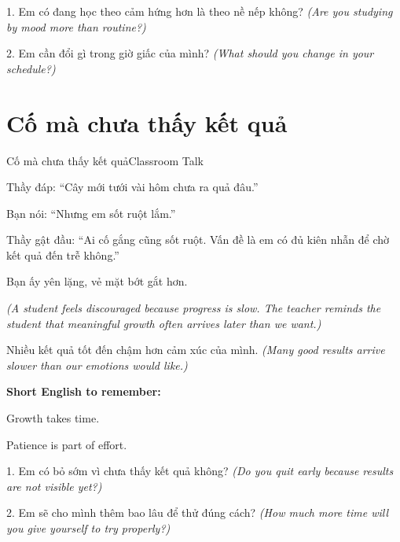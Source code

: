 \begin{tuhocnhanh}
1. Em có đang học theo cảm hứng hơn là theo nề nếp không? \textit{(Are you studying by mood more than routine?)}

2. Em cần đổi gì trong giờ giấc của mình? \textit{(What should you change in your schedule?)}
\end{tuhocnhanh}
\ngancach

\section{Cố mà chưa thấy kết quả}
\begin{truyen}{Cố mà chưa thấy kết quả}{Classroom Talk}

Thầy đáp: ``Cây mới tưới vài hôm chưa ra quả đâu.''

Bạn nói: ``Nhưng em sốt ruột lắm.''

Thầy gật đầu: ``Ai cố gắng cũng sốt ruột. Vấn đề là em có đủ kiên nhẫn để chờ kết quả đến trễ không.''

Bạn ấy yên lặng, vẻ mặt bớt gắt hơn.

\textit{(A student feels discouraged because progress is slow. The teacher reminds the student that meaningful growth often arrives later than we want.)}
\end{truyen}

\begin{baihoc}
Nhiều kết quả tốt đến chậm hơn cảm xúc của mình.
\textit{(Many good results arrive slower than our emotions would like.)}
\end{baihoc}

\begin{ghinhoanh}
\textbf{Short English to remember:}

Growth takes time.

Patience is part of effort.
\end{ghinhoanh}

\begin{tuhocnhanh}
1. Em có bỏ sớm vì chưa thấy kết quả không? \textit{(Do you quit early because results are not visible yet?)}

2. Em sẽ cho mình thêm bao lâu để thử đúng cách? \textit{(How much more time will you give yourself to try properly?)}
\end{tuhocnhanh}
\ngancach

